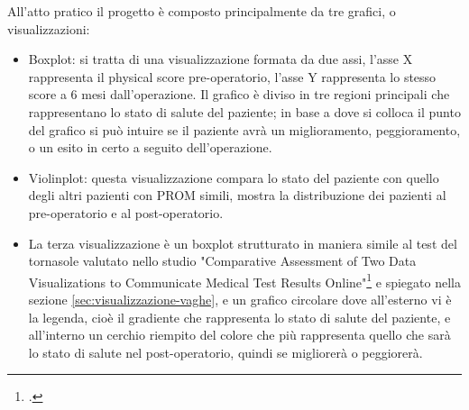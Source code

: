 All'atto pratico il progetto è composto principalmente da tre grafici, o visualizzazioni: 
\begin{itemize}
    \item Boxplot: si tratta di una visualizzazione formata da due assi, l'asse X rappresenta il physical score pre-operatorio, l'asse Y rappresenta lo stesso score a 6 mesi dall'operazione. Il grafico è diviso in tre regioni principali che rappresentano lo stato di salute del paziente; in base a dove si colloca il punto del grafico si può intuire se il paziente avrà un miglioramento, peggioramento, o un esito in certo a seguito dell'operazione. 
    \item Violinplot: questa visualizzazione compara lo stato del paziente con quello degli altri pazienti con PROM simili, mostra la distribuzione dei pazienti al pre-operatorio e al post-operatorio. 
    \item La terza visualizzazione è un boxplot strutturato in maniera simile al test del tornasole valutato nello studio "Comparative Assessment of Two Data Visualizations to Communicate Medical Test Results Online"\footcite{womak:comparative-assesment} e spiegato nella sezione \ref*{sec:visualizzazione-vaghe}, e un grafico circolare dove all'esterno vi è la legenda, cioè il gradiente che rappresenta lo stato di salute del paziente, e all'interno un cerchio riempito del colore che più rappresenta quello che sarà lo stato di salute nel post-operatorio, quindi se migliorerà o peggiorerà. 
\end{itemize}

